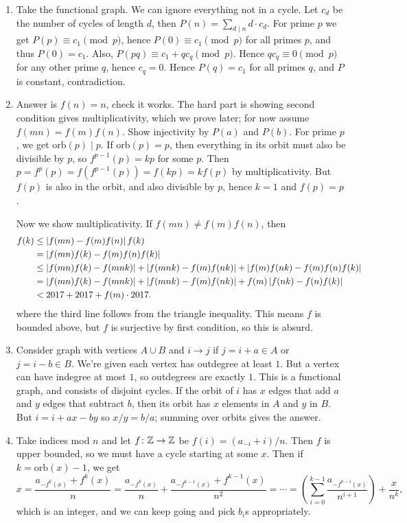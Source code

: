 \documentclass[11pt,paper=letter]{scrartcl}
\newcommand{\orb}[1]{\mathrm{orb}(#1)}
\begin{document}
\begin{enumerate}
\item Take the functional graph. We can ignore everything not in a cycle. Let $c_d$ be the number of cycles of length $d$, then $P(n) = \sum_{d \mid n} d \cdot c_d$. For prime $p$ we get $P(p) \equiv c_1 \pmod p$, hence $P(0) \equiv c_1 \pmod p$ for all primes $p$, and thus $P(0) = c_1$. Also, $P(pq) \equiv c_1 + qc_q \pmod p$. Hence $qc_q \equiv 0 \pmod p$ for any other prime $q$, hence $c_q = 0$. Hence $P(q) = c_1$ for all primes $q$, and $P$ is constant, contradiction.

\item Answer is $f(n) = n$, check it works. The hard part is showing second condition gives multiplicativity, which we prove later; for now assume $f(mn) = f(m)f(n)$. Show injectivity by $P(a)$ and $P(b)$. For prime $p$, we get $\orb{p} \mid p$. If $\orb{p} = p$, then everything in its orbit must also be divisible by $p$, so $f^{p-1}(p) = kp$ for some $p$. Then $p = f^p(p) = f(f^{p-1}(p)) = f(kp) = kf(p)$ by multiplicativity. But $f(p)$ is also in the orbit, and also divisible by $p$, hence $k = 1$ and $f(p) = p$.

Now we show multiplicativity. If $f(mn) \ne f(m)f(n)$, then
\begin{align*}
f(k) &\le \left\lvert f(mn) - f(m)f(n) \right\rvert f(k) \\
     &= \left\lvert f(mn)f(k) - f(m)f(n)f(k) \right\rvert \\
     &\le \left\lvert f(mn)f(k) - f(mnk) \right\rvert + \left\lvert f(mnk) - f(m)f(nk) \right\rvert + \left\lvert f(m)f(nk) - f(m)f(n)f(k) \right\rvert \\
     &= \left\lvert f(mn)f(k) - f(mnk) \right\rvert + \left\lvert f(mnk) - f(m)f(nk) \right\rvert + f(m)\left\lvert f(nk) - f(n)f(k) \right\rvert \\
     &< 2017 + 2017 + f(m) \cdot 2017.
\end{align*}
where the third line follows from the triangle inequality. This means $f$ is bounded above, but $f$ is surjective by first condition, so this is absurd.

\item Consider graph with vertices $A \cup B$ and $i \to j$ if $j = i + a \in A$ or $j = i - b \in B$. We're given each vertex has outdegree at least $1$. But a vertex can have indegree at most $1$, so outdegrees are exactly $1$. This is a functional graph, and consists of disjoint cycles. If the orbit of $i$ has $x$ edges that add $a$ and $y$ edges that subtract $b$, then its orbit has $x$ elements in $A$ and $y$ in $B$. But $i = i + ax - by$ so $x/y = b/a$; summing over orbits gives the answer.

\item Take indices mod $n$ and let $f \colon \mathbb Z \to \mathbb Z$ be $f(i) = (a_{-i} + i)/n$. Then $f$ is upper bounded, so we must have a cycle starting at some $x$. Then if $k = \orb{x} - 1$, we get \[
  x = \frac{a_{-f^{k}(x)} + f^{k}(x)}{n} = \frac{a_{-f^{k}(x)}}{n} + \frac{a_{-f^{k-1}(x)} + f^{k-1}(x)}{n^2} = \cdots = \left(\sum_{i = 0}^{k - 1} \frac{a_{-f^{k-i}(x)}}{n^{i+1}}\right) + \frac{x}{n^k},
\]
which is an integer, and we can keep going and pick $b_i$s appropriately.


\end{enumerate}
\end{document}
